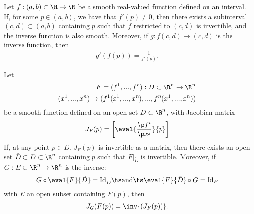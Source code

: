 \documentclass{article}
\begin{document}
\begin{theorem}
    Let $f:(a,b)\subset \R \to \R$ be a smooth real-valued function defined on an 
    interval. If, for some $p\in(a,b)$, we have that $f'(p)\not=0$, then there exists
    a subinterval $(c,d)\subset(a,b)$ containing $p$ such that $f$ restricted to $(c,d)$
    is invertible, and the inverse function is also smooth. Moreover, if
    $g:f(c,d)\to(c,d)$ is the inverse function, then
    \begin{align*}
        g'(f(p))=\frac{1}{f'(p)}.
    \end{align*} 
\end{theorem}

\begin{theorem}
    Let 
    \begin{align*}
        F = (f^1,...,f^n):D\subset \R^n\to\R^n\\
        (x^1,...,x^n)\mapsto (f^1(x^1,...,x^n), ..., f^n(x^1,...,x^n))
    \end{align*} 
    be a smooth function defined on an open set $D\subset\R^n$, with Jacobian matrix 
    \begin{align*}
        J_F(p)=\left[\eval{\frac{\p f^i}{\p x^j}}{p}\right]
    \end{align*}
    If, at any point $p\in D$, $J_F(p)$ is invertible as a matrix, then there exists 
    an open set $\tilde D\subset D\subset \R^n$ containing $p$ such that $F|_{\tilde D}$
    is invertible.
    Moreover, if $G:E\subset\R^n\to \R^n$ is the inverse:
    \begin{align*}
        G\circ \eval{F}{\tilde D}=\text{Id}_{\tilde D} \hs\text{and}\hs \eval{F}{\tilde D}\circ G=\text{Id}_E
    \end{align*}
    with $E$ an open subset containing $F(p)$, then
    \begin{align*}
        J_G(F(p))=\inv{(J_F(p))}.
    \end{align*}
\end{theorem}
\end{document}
